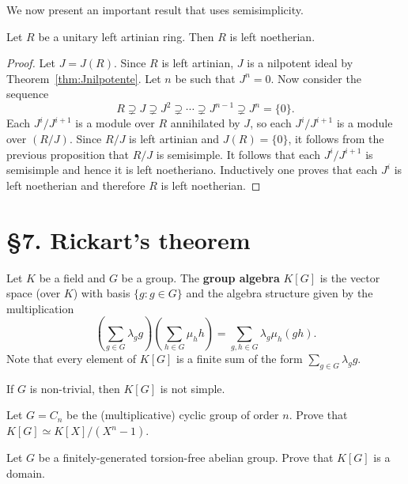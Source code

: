 
We now present an important result that uses 
semisimplicity. 

\begin{theorem}
	\label{thm:Hopkins-Levitski}
	Let $R$ be a unitary left artinian ring. Then $R$ is left noetherian.
\end{theorem}

\begin{proof}
	Let $J=J(R)$. Since $R$ is left artinian, $J$ is a nilpotent ideal 
	by Theorem~\ref{thm:Jnilpotente}. Let $n$ be such that $J^n=0$. Now consider the sequence 
	\[
		R\supsetneq J\supsetneq J^2\supsetneq\cdots\supsetneq J^{n-1}\supsetneq J^n=\{0\}.
	\]
	Each $J^{i}/J^{i+1}$ is a module over $R$ annihilated by $J$, so each  
	$J^i/J^{i+1}$ is a module over $(R/J)$. Since $R/J$ is left artinian and 
	$J(R)=\{0\}$, it follows from the previous proposition that $R/J$ is semisimple. 
	It follows that each $J^{i}/J^{i+1}$ 
	is semisimple and hence it is left noetheriano. Inductively one proves that each 
	$J^i$ is left noetherian and therefore $R$ is left noetherian. 
\end{proof}


\section*{\S7. Rickart's theorem}

Let $K$ be a field and $G$ be a group. The \textbf{group algebra} $K[G]$ 
is the vector space (over $K$) with basis $\{g:g\in G\}$ 
and the algebra structure given by the multiplication
\[
	\left(\sum_{g\in G}\lambda_gg\right)\left(\sum_{h\in G}\mu_hh\right)
	=\sum_{g,h\in G}\lambda_g\mu_h(gh).
\]
Note that every element of $K[G]$ is a finite sum of the form $\sum_{g\in G}\lambda_gg$.

\begin{exercise}
\label{xc:K[G]notsimple}
    If $G$ is non-trivial, then $K[G]$ is not simple. 
\end{exercise}

\begin{exercise}
	Let $G=C_n$ be the (multiplicative) cyclic group of order $n$. Prove that 
	$K[G]\simeq K[X]/(X^n-1)$. 
\end{exercise}

\begin{exercise}
	Let $G$ be a finitely-generated torsion-free abelian group. Prove that 
	$K[G]$ is a domain. 
\end{exercise}

